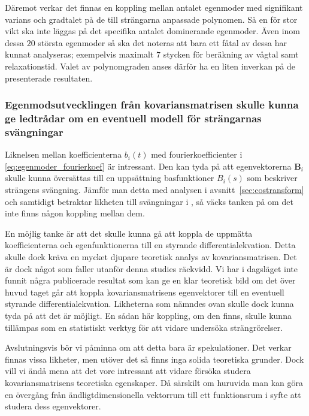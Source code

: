 Däremot verkar det finnas en koppling mellan antalet egenmoder med signifikant varians och gradtalet på de till strängarna anpassade polynomen. Så en för stor vikt ska inte läggas på det specifika antalet dominerande egenmoder. Även inom dessa $20$ största egenmoder så ska det noteras att bara ett fåtal av dessa har kunnat analyseras; exempelvis maximalt $7$ stycken för beräkning av vågtal samt relaxationstid. Valet av polynomgraden anses därför ha en liten inverkan på de presenterade resultaten.


\subsubsection{Egenmodsutvecklingen från kovariansmatrisen skulle kunna ge ledtrådar om en eventuell modell för strängarnas svängningar}
\label{disk:kovmatris}
Liknelsen mellan koefficienterna $b_i(t)$ med fourierkoefficienter i \eqref{eq:egenmoder_fourierkoef} är intressant. Den kan tyda på att egenvektorerna $\mathbf{B}_i$ skulle kunna översättas till en uppsättning basfunktioner $B_i(s)$ som beskriver strängens svängning. 
Jämför man detta med analysen i avsnitt~\ref{sec:costransform} och samtidigt betraktar likheten till svängningar i , så väcks tanken på om det inte finns någon koppling mellan dem.

En möjlig tanke är att det skulle kunna gå att  koppla de uppmätta koefficienterna och egenfunktionerna till en styrande differentialekvation. Detta skulle dock kräva en mycket djupare teoretisk analys av kovariansmatrisen. %
Det är dock något som faller utanför denna studies räckvidd.
Vi har i dagsläget inte funnit några publicerade resultat som kan ge en klar teoretisk bild om det över huvud taget går att koppla kovariansmatrisens egenvektorer till en eventuell styrande differentialekvation. Likheterna som nämndes ovan skulle dock kunna tyda på att det är möjligt.
En sådan här koppling, om den finns, skulle kunna tillämpas som en statistiskt verktyg för att vidare undersöka strängrörelser.

Avslutningsvis bör vi påminna om att detta bara är spekulationer. Det verkar finnas vissa likheter, men utöver det så finns inga solida teoretiska grunder. Dock vill vi ändå mena att det vore intressant att vidare försöka studera kovariansmatrisens teoretiska egenskaper. Då särskilt om huruvida man kan göra en övergång från ändligtdimensionella vektorrum till ett funktionsrum i syfte att studera dess egenvektorer. 

